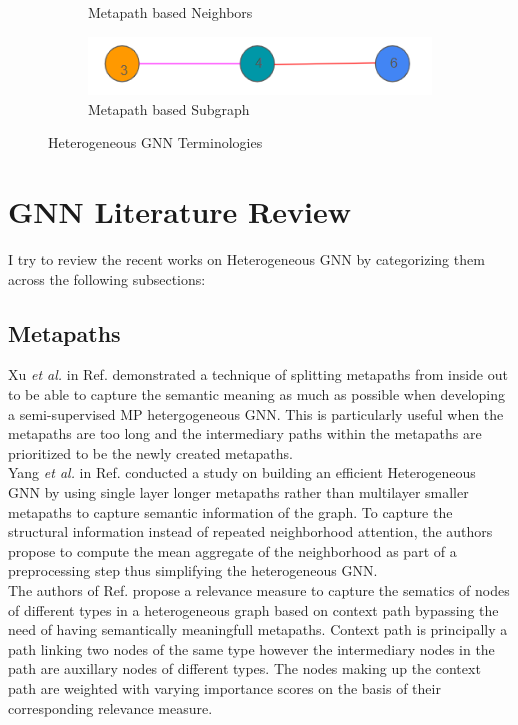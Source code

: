 \documentclass{report} %
\begin{document}
\begin{figure}[H]
\begin{subfigure}{0.35\textwidth}
        \caption{Metapath based Neighbors} %
        \label{fig:MetapathNeighbors}
    \end{subfigure}\hfill
    \begin{subfigure}{0.35\textwidth}
        \centering
        \includegraphics[width=\textwidth]{./ReportImages/Metasubgraph.png}
        \caption{Metapath based Subgraph}
        \label{fig:Metasubgraph}
    \end{subfigure}
    \caption{Heterogeneous \ac{GNN} Terminologies}
    \label{fig:Heterogeneous GNN Terminologies}
\end{figure}

\section{GNN Literature Review}\label{sec:HGNN Literature Review}
I try to review the recent works on Heterogeneous \ac{GNN} by categorizing them across the following subsections:

\subsection{Metapaths}\label{subsec:HGNN Metapaths}
Xu \textit{et al.} in Ref. \cite{EMPHGNN-2023} demonstrated a technique of splitting metapaths from inside out to be able to capture the semantic meaning as much as 
possible when developing a semi-supervised \ac{MP} hetergogeneous \ac{GNN}. This is particularly useful when the metapaths are too long and the 
intermediary paths within the metapaths are prioritized to be the newly created metapaths.\\
Yang \textit{et al.} in Ref. \cite{SE HGNN-2023} conducted a study on building an efficient Heterogeneous \ac{GNN} by using single layer longer metapaths rather than 
multilayer smaller metapaths to capture semantic information of the graph. To capture the structural information instead of repeated neighborhood attention, 
the authors propose to compute the mean aggregate of the neighborhood as part of a preprocessing step thus simplifying the heterogeneous \ac{GNN}. \\
The authors of Ref. \cite{HGNNRM-2023} propose a relevance measure to capture the sematics of nodes of different types in a heterogeneous graph based on context path 
bypassing the need of having semantically meaningfull metapaths. Context path is principally a path linking two nodes of the same type however the intermediary nodes in the 
path are auxillary nodes of different types. The nodes making up the context path are weighted with varying importance scores on the basis of their corresponding relevance measure.
\end{document}
